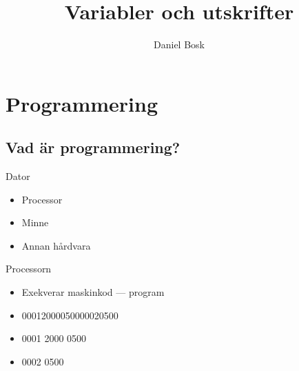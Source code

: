 \title{%
  Variabler och utskrifter
}
\author{Daniel Bosk}


\mode*

\begin{abstract}
  
\end{abstract}


\section{Programmering}

\subsection{Vad är programmering?}

\begin{frame}
  \begin{block}{Dator}
    \begin{itemize}
      \item Processor
      \item Minne
      \item Annan hårdvara
    \end{itemize}
  \end{block}
\end{frame}

\begin{frame}
  \begin{block}{Processorn}
    \begin{itemize}
      \item Exekverar maskinkod --- program
    \end{itemize}
  \end{block}

  \pause

  \begin{example}
    \begin{itemize}
      \item<1-2> 00012000050000020500
      \item<3-> 0001 2000 0500
      \item<3-> 0002 0500
    \end{itemize}
  \end{example}
\end{frame}

